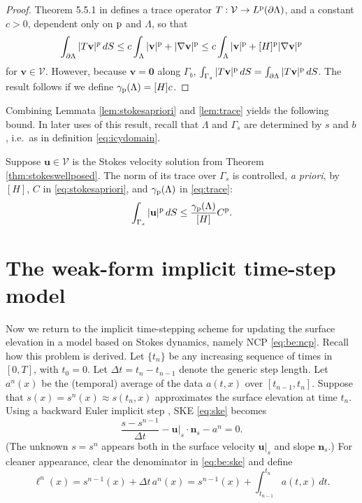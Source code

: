 \documentclass[hidelinks,onefignum,onetabnum,final]{siamart220329}  %
\newcommand{\grad}{\nabla}
\newcommand{\bn}{\mathbf{n}}
\newcommand{\bu}{\mathbf{u}}
\newcommand{\bv}{\mathbf{v}}
\newcommand{\bzero}{\bm{0}}
\newcommand{\cV}{\mathcal{V}}
\newcommand{\pp}{{\text{\textnormal{p}}}}
\begin{document}
\begin{proof}
Theorem 5.5.1 in \cite{Evans2010} defines a trace operator $T:\cV\to L^\pp(\partial\Lambda)$, and a constant $c>0$, dependent only on $\pp$ and $\Lambda$, so that
\begin{equation}
\int_{\partial\Lambda} |T\bv|^p\,dS \le c \int_{\Lambda} |\bv|^\pp + |\grad\bv|^\pp \le c \int_{\Lambda} |\bv|^\pp + [H]^\pp |\grad\bv|^\pp \label{eq:tracework}
\end{equation}
for $\bv\in\cV$.  However, because $\bv=\bzero$ along $\Gamma_b$, $\int_{\Gamma_s} |T\bv|^\pp\,dS = \int_{\partial\Lambda} |T\bv|^\pp\,dS$.  The result follows if we define $\gamma_{\pp}(\Lambda)=[H] c$.
\end{proof}

Combining Lemmata \ref{lem:stokesapriori} and \ref{lem:trace} yields the following bound.  In later uses of this result, recall that $\Lambda$ and $\Gamma_s$ are determined by $s$ and $b$, i.e.~as in definition \eqref{eq:icydomain}.

\begin{corollary} \label{cor:surfacetracebound}
Suppose $\bu\in\cV$ is the Stokes velocity solution from Theorem \ref{thm:stokeswellposed}.  The norm of its trace over $\Gamma_s$ is controlled, \emph{a priori}, by $[H]$, $C$ in \eqref{eq:stokesapriori}, and $\gamma_{\pp}(\Lambda)$ in \eqref{eq:trace}:
\begin{equation}
\int_{\Gamma_s} |\bu|^\pp \,dS \le \frac{\gamma_{\pp}(\Lambda)}{[H]} C^\pp. \label{eq:surfacetracebound}
\end{equation}
\end{corollary}


\section{The weak-form implicit time-step model} \label{sec:model}

Now we return to the implicit time-stepping scheme for updating the surface elevation in a model based on Stokes dynamics, namely NCP \eqref{eq:be:ncp}.  Recall how this problem is derived.  Let $\{t_n\}$ be any increasing sequence of times in $[0,T]$, with $t_0=0$.  Let $\Delta t = t_n-t_{n-1}$ denote the generic step length.  Let $a^n(x)$ be the (temporal) average of the data $a(t,x)$ over $[t_{n-1},t_n]$.  Suppose that $s(x)=s^n(x)\approx s(t_n,x)$ approximates the surface elevation at time $t_n$.  Using a backward Euler implicit step \cite{AscherPetzold1998}, SKE \eqref{eq:ske} becomes
\begin{equation}
\frac{s - s^{n-1}}{\Delta t} - \bu|_{s} \cdot \bn_{s} - a^n = 0. \label{eq:be:ske}
\end{equation}
(The unknown $s=s^n$ appears both in the surface velocity $\bu|_s$ and slope $\bn_s$.)  For cleaner appearance, clear the denominator in \eqref{eq:be:ske} and define
\begin{equation}
\ell^n(x) = s^{n-1}(x)+\Delta t\,a^n(x) = s^{n-1}(x) + \int_{t_{n-1}}^{t_n} a(t,x)\,dt. \label{eq:be:source}
\end{equation}
\end{document}
